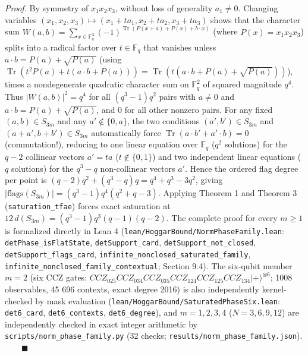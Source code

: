 \documentclass[11pt,a4paper]{article}
\begin{document}
\emph{Proof.} By symmetry of \(x_1 x_2 x_3\), without loss of generality \(a_1 \ne 0\). Changing variables
\((x_1, x_2, x_3) \mapsto (x_1 + t a_1, x_2 + t a_2, x_3 + t a_3)\) shows that the character sum
\(W(a, b) = \sum_{x \in \mathbb{F}_q^3} (-1)^{\operatorname{Tr}(P(x+a) + P(x) + b \cdot x)}\) (where
\(P(x) = x_1 x_2 x_3\)) splits into a radical factor over \(t \in \mathbb{F}_q\) that vanishes unless
\(a \cdot b = P(a) + \sqrt{P(a)}\) (using \(\operatorname{Tr}(t^2 P(a) + t(a \cdot b + P(a))) = \operatorname{Tr}(t(a \cdot b + P(a) + \sqrt{P(a)}))\)),
times a nondegenerate quadratic character sum on \(\mathbb{F}_q^2\) of squared magnitude \(q^4\). Thus
\(|W(a, b)|^2 = q^4\) for all \((q^3 - 1)q^2\) pairs with \(a \ne 0\) and \(a \cdot b = P(a) + \sqrt{P(a)}\), and
\(0\) for all other nonzero pairs. For any fixed \((a, b) \in S_{3m}\) and any \(a' \notin \{0, a\}\), the two
conditions \((a', b') \in S_{3m}\) and \((a + a', b + b') \in S_{3m}\) automatically force
\(\operatorname{Tr}(a \cdot b' + a' \cdot b) = 0\) (commutation!), reducing to one linear equation over
\(\mathbb{F}_q\) (\(q^2\) solutions) for the \(q - 2\) collinear vectors \(a' = t a\) (\(t \notin \{0, 1\}\)) and
two independent linear equations (\(q\) solutions) for the \(q^3 - q\) non-collinear vectors \(a'\). Hence the
ordered flag degree per point is \((q - 2)q^2 + (q^3 - q)q = q^4 + q^3 - 3q^2\), giving
\(|\text{flags}(S_{3m})| = (q^3 - 1)q^4(q^2 + q - 3)\). Applying Theorem 1 and Theorem 3 (\texttt{saturation\_tfae})
forces exact saturation at \(12\,d(S_{3m}) = (q^3 - 1)q^3(q - 1)(q - 2)\). The complete proof for every
\(m \ge 1\) is formalized directly in Lean 4 (\nolinkurl{lean/HoggarBound/NormPhaseFamily.lean}:
\nolinkurl{detPhase_isFlatState}, \texttt{detSupport\_card}, \nolinkurl{detSupport_not_closed}, \nolinkurl{detSupport_flags_card},
\nolinkurl{infinite_nonclosed_saturated_family}, \nolinkurl{infinite_nonclosed_family_contextual}; Section 9.4). The
six-qubit member \(m = 2\) (six CCZ gates: \(CCZ_{025} CCZ_{034} CCZ_{035} CCZ_{124} CCZ_{125} CCZ_{134} |{+}\rangle^{\otimes 6}\);
1008 observables, 45 696 contexts, exact degree 2016) is also independently kernel-checked by mask
evaluation (\nolinkurl{lean/HoggarBound/SaturatedPhaseSix.lean}: \texttt{det6\_card}, \texttt{det6\_contexts}, \texttt{det6\_degree}), and
\(m = 1, 2, 3, 4\) (\(N = 3, 6, 9, 12\)) are independently checked in exact integer arithmetic by
\nolinkurl{scripts/norm_phase_family.py} (32 checks; \nolinkurl{results/norm_phase_family.json}). \(\qquad\blacksquare\)
\end{document}
